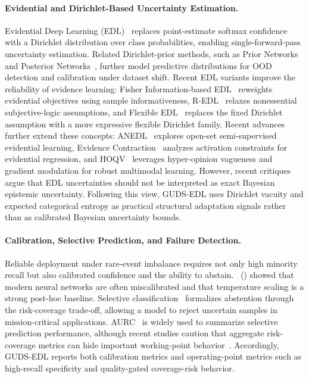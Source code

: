 \documentclass[letterpaper]{article} %
\begin{document}
\paragraph{Evidential and Dirichlet-Based Uncertainty Estimation.} Evidential Deep Learning (EDL)~\cite{sensoy2018evidential} replaces point-estimate softmax confidence with a Dirichlet distribution over class probabilities, enabling single-forward-pass uncertainty estimation. Related Dirichlet-prior methods, such as Prior Networks~\cite{malinin2018predictive} and Posterior Networks~\cite{charpentier2020posterior}, further model predictive distributions for OOD detection and calibration under dataset shift. Recent EDL variants improve the reliability of evidence learning: Fisher Information-based EDL~\cite{deng2023fisher} reweights evidential objectives using sample informativeness, R-EDL~\cite{chen2023redl} relaxes nonessential subjective-logic assumptions, and Flexible EDL~\cite{yoon2025flexible} replaces the fixed Dirichlet assumption with a more expressive flexible Dirichlet family. Recent advances further extend these concepts: ANEDL~\cite{yu2024anedl} explores open-set semi-supervised evidential learning, Evidence Contraction~\cite{wu2024evidence} analyzes activation constraints for evidential regression, and HOQV~\cite{hu2026hoqv} leverages hyper-opinion vagueness and gradient modulation for robust multimodal learning. However, recent critiques~\cite{shen2024mirage} argue that EDL uncertainties should not be interpreted as exact Bayesian epistemic uncertainty. Following this view, GUDS-EDL uses Dirichlet vacuity and expected categorical entropy as practical structural adaptation signals rather than as calibrated Bayesian uncertainty bounds.

\paragraph{Calibration, Selective Prediction, and Failure Detection.} Reliable deployment under rare-event imbalance requires not only high minority recall but also calibrated confidence and the ability to abstain. \citeauthor{guo2017calibration}~(\citeyear{guo2017calibration}) showed that modern neural networks are often miscalibrated and that temperature scaling is a strong post-hoc baseline. Selective classification~\cite{geifman2017selective,geifman2019selectivenet} formalizes abstention through the risk-coverage trade-off, allowing a model to reject uncertain samples in mission-critical applications. AURC~\cite{ding2020revisiting} is widely used to summarize selective prediction performance, although recent studies caution that aggregate risk-coverage metrics can hide important working-point behavior~\cite{jaeger2023call,traub2024overcoming}. Accordingly, GUDS-EDL reports both calibration metrics and operating-point metrics such as high-recall specificity and quality-gated coverage-risk behavior.
\end{document}
